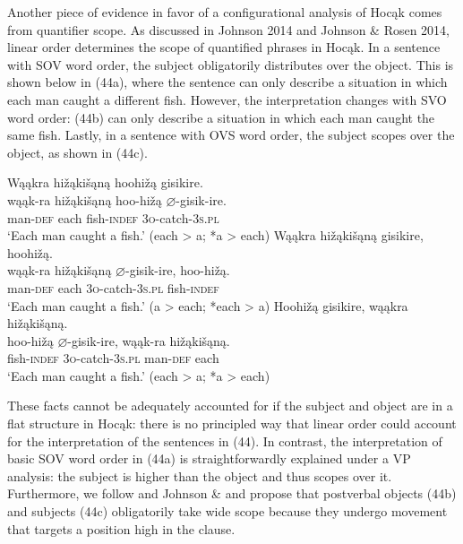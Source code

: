 \documentclass[output=paper]{LSP/langsci}
\begin{document}
Another piece of evidence in favor of a configurational analysis of Hoc\k{a}k comes from quantifier scope. As discussed in Johnson 2014 and Johnson \& Rosen 2014, linear order determines the scope of quantified phrases in Hoc\k{a}k. In a sentence with SOV word order, the subject obligatorily distributes over the object. This is shown below in (44a), where the sentence can only describe a situation in which each man caught a different fish. However, the interpretation changes with SVO word order: (44b) can only describe a situation in which each man caught the same fish. Lastly, in a sentence with OVS word order, the subject scopes over the object, as shown in (44c).

\begin{exe}
\ex
\begin{xlist}
\ex 
\glll W\k{a}\k{a}kra	hi\v{z}\k{a}ki\v{s}\k{a}n\k{a}		hoohi\v{z}\k{a}	gisikire.\\
w\k{a}\k{a}k-ra		hi\v{z}\k{a}ki\v{s}\k{a}n\k{a}		hoo-hi\v{z}\k{a}	$\varnothing$-gisik-ire. \\
		man-\textsc{def}		each					fish-\textsc{indef}		\textsc{3o}-catch-\textsc{3s.pl} \\
\trans `Each man caught a fish.' (each > a; *a > each)
\ex 
\glll W\k{a}\k{a}kra		hi\v{z}\k{a}ki\v{s}\k{a}n\k{a}		gisikire,			hoohi\v{z}\k{a}.\\
w\k{a}\k{a}k-ra		hi\v{z}\k{a}ki\v{s}\k{a}n\k{a}		$\varnothing$-gisik-ire,	hoo-hi\v{z}\k{a}. \\
		man-\textsc{def}		each					\textsc{3o}-catch-\textsc{3s.pl}		fish-\textsc{indef} \\
\trans `Each man caught a fish.'  (a > each; *each > a)
\ex 
\glll Hoohi\v{z}\k{a}	gisikire,	w\k{a}\k{a}kra	 hi\v{z}\k{a}ki\v{s}\k{a}n\k{a}.\\
hoo-hi\v{z}\k{a}	$\varnothing$-gisik-ire,		w\k{a}\k{a}k-ra	hi\v{z}\k{a}ki\v{s}\k{a}n\k{a}. \\
		fish-\textsc{indef}		\textsc{3o}-catch-\textsc{3s.pl}		man-\textsc{def}		each \\
\trans `Each man caught a fish.' (each > a; *a > each)
\end{xlist}
\end{exe}

These facts cannot be adequately accounted for if the subject and object are in a flat structure in Hoc\k{a}k: there is no principled way that linear order could account for the interpretation of the sentences in (44). In contrast, the interpretation of basic SOV word order in (44a) is straightforwardly explained under a VP analysis: the subject is higher than the object and thus scopes over it. Furthermore, we follow \citet{Johnson2014} and Johnson \& \citet{Rosen2014} and propose that postverbal objects (44b) and subjects (44c) obligatorily take wide scope because they undergo movement that targets a position high in the clause. 
\end{document}
